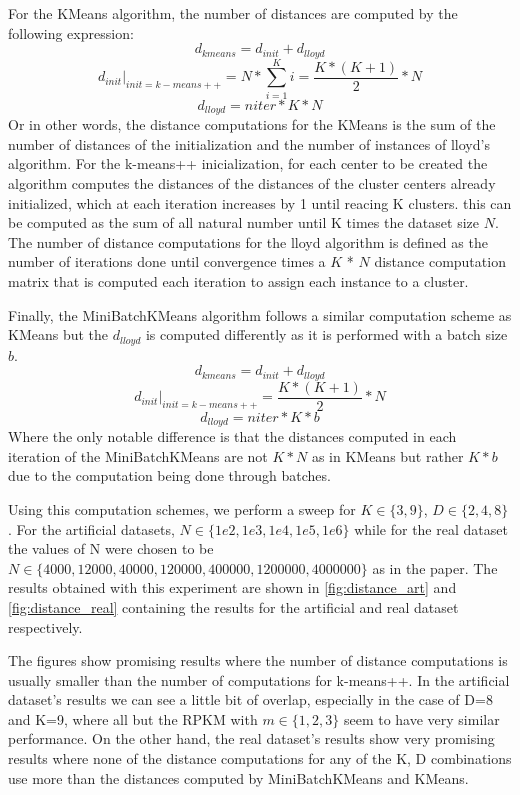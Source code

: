 For the KMeans algorithm, the number of distances are computed by the following expression:
$$d_{kmeans} = d_{init} + d_{lloyd}$$
$$d_{init} \bigg\rvert_{init=k-means++} = N * \sum_{i=1}^K i = \frac{K*(K+1)}{2} * N$$
$$d_{lloyd} = niter * K * N$$
Or in other words, the distance computations for the KMeans is the sum of the number of distances of the initialization and the number of instances of lloyd's algorithm. For the k-means++ inicialization, for each center to be created the algorithm computes the distances of the distances of the cluster centers already initialized, which at each iteration increases by 1 until reacing K clusters. this can be computed as the sum of all natural number until K times the dataset size $N$. The number of distance computations for the lloyd algorithm is defined as the number of iterations done until convergence times a $K$ * $N$ distance computation matrix that is computed each iteration to assign each instance to a cluster.

Finally, the MiniBatchKMeans algorithm follows a similar computation scheme as KMeans but the $d_{lloyd}$ is computed differently as it is performed with a batch size $b$.
$$d_{kmeans} = d_{init} + d_{lloyd}$$
$$d_{init} \bigg\rvert_{init=k-means++} = \frac{K*(K+1)}{2} * N$$
$$d_{lloyd} = niter * K * b$$
Where the only notable difference is that the distances computed in each iteration of the MiniBatchKMeans are not $K*N$ as in KMeans but rather $K*b$ due to the computation being done through batches.

Using this computation schemes, we perform a sweep for $K \in \{3, 9\}$, $D \in \{2, 4, 8\}$. For the artificial datasets, $N \in \{1e2, 1e3, 1e4, 1e5, 1e6\}$ while for the real dataset the values of N were chosen to be $N \in \{4000, 12000, 40000, 120000, 400000, 1200000, 4000000\}$ as in the paper. The results obtained with this experiment are shown in \ref{fig:distance_art} and \ref{fig:distance_real} containing the results for the artificial and real dataset respectively.

The figures show promising results where the number of distance computations is usually smaller than the number of computations for k-means++. In the artificial dataset's results we can see a little bit of overlap, especially in the case of D=8 and K=9, where all but the RPKM with $m \in \{1,2,3\}$ seem to have very similar performance. On the other hand, the real dataset's results show very promising results where none of the distance computations for any of the K, D combinations use more than the distances computed by MiniBatchKMeans and KMeans.

